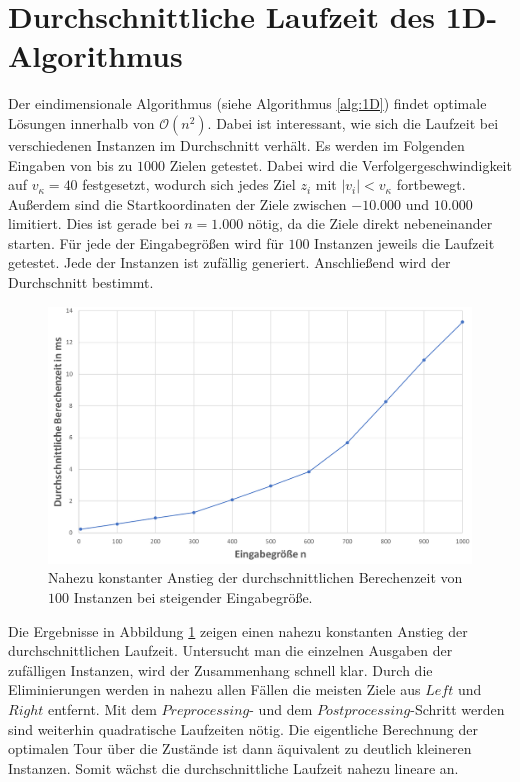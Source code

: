 \documentclass[german,version-2019-11]{uzl-thesis}
\begin{document}
\section{Durchschnittliche Laufzeit des 1D-Algorithmus}

Der eindimensionale Algorithmus (siehe Algorithmus \ref{alg:1D}) findet optimale Lösungen innerhalb von $\mathcal{O}(n^2)$. Dabei ist interessant, wie sich die Laufzeit bei verschiedenen Instanzen im Durchschnitt verhält. Es werden im Folgenden Eingaben von bis zu $1000$ Zielen getestet. Dabei wird die Verfolgergeschwindigkeit auf $v_\kappa=40$ festgesetzt, wodurch sich jedes Ziel $z_i$ mit $|v_i|<v_\kappa$ fortbewegt. Außerdem sind die Startkoordinaten der Ziele zwischen $-10.000$ und $10.000$ limitiert. Dies ist gerade bei $n=1.000$ nötig, da die Ziele direkt nebeneinander starten. Für jede der Eingabegrößen wird für $100$ Instanzen jeweils die Laufzeit getestet. Jede der Instanzen ist zufällig generiert. Anschließend wird der Durchschnitt bestimmt. \\
\begin{figure}[htpb]
\centering
\includegraphics[scale=0.24]{../Grafiken/Verwendete/Exp1D_2.png}
\caption{Nahezu konstanter Anstieg der durchschnittlichen Berechenzeit von $100$ Instanzen bei steigender Eingabegröße.}
\label{fig:Exp1D}
\end{figure} \noindent
Die Ergebnisse in Abbildung \ref{fig:Exp1D} zeigen einen nahezu konstanten Anstieg der durchschnittlichen Laufzeit. Untersucht man die einzelnen Ausgaben der zufälligen Instanzen, wird der Zusammenhang schnell klar. Durch die Eliminierungen werden in nahezu allen Fällen die meisten Ziele aus $Left$ und $Right$ entfernt. Mit dem $Preprocessing$- und dem $Postprocessing$-Schritt werden sind weiterhin quadratische Laufzeiten nötig. Die eigentliche Berechnung der optimalen Tour über die Zustände ist dann äquivalent zu deutlich kleineren Instanzen. Somit wächst die durchschnittliche Laufzeit nahezu lineare an. 
\end{document}
